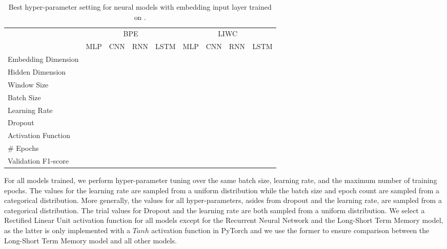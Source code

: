 \begin{landscape}
\begin{table}[]
\centering
\begin{tabular}{l|llll|llll}
                      & \multicolumn{4}{c|}{BPE}                 & \multicolumn{4}{c}{LIWC} \\
                      & MLP     & CNN     & RNN     & LSTM    & MLP     & CNN     & RNN     & LSTM    \\ \hline
Embedding Dimension   &         &         &         &         &         &         &         &         \\
Hidden Dimension      &         &         &         &         &         &         &         &         \\
Window Size           &         &         &         &         &         &         &         &         \\
Batch Size            &         &         &         &         &         &         &         &         \\
Learning Rate         &         &         &         &         &         &         &         &         \\
Dropout               &         &         &         &         &         &         &         &         \\
Activation Function   &         &         &         &         &         &         &         &         \\
\# Epochs              &         &         &         &         &         &         &         &         \\
Validation F1-score   &         &         &         &         &         &         &         &
\end{tabular}
\caption{Best hyper-parameter setting for neural models with embedding input layer trained on \citet{Wulczyn:2017}.}
\label{tab:redux_hyperparam_search_wulczyn}
\end{table}
\end{landscape}

For all models trained, we perform hyper-parameter tuning over the same batch size, learning rate, and the maximum number of training epochs. The values for the learning rate are sampled from a uniform distribution while the batch size and epoch count are sampled from a categorical distribution. More generally, the values for all hyper-parameters, asides from dropout and the learning rate, are sampled from a categorical distribution. The trial values for Dropout and the learning rate are both sampled from a uniform distribution. We select a Rectified Linear Unit \cite{CITE: RELU paper} activation function for all models except for the Recurrent Neural Network and the Long-Short Term Memory model, as the latter is only implemented with a $Tanh$ activation function in PyTorch and we use the former to ensure comparison between the Long-Short Term Memory model and all other models.

